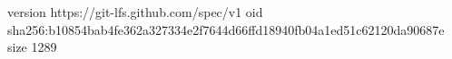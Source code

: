 version https://git-lfs.github.com/spec/v1
oid sha256:b10854bab4fe362a327334e2f7644d66ffd18940fb04a1ed51c62120da90687e
size 1289
